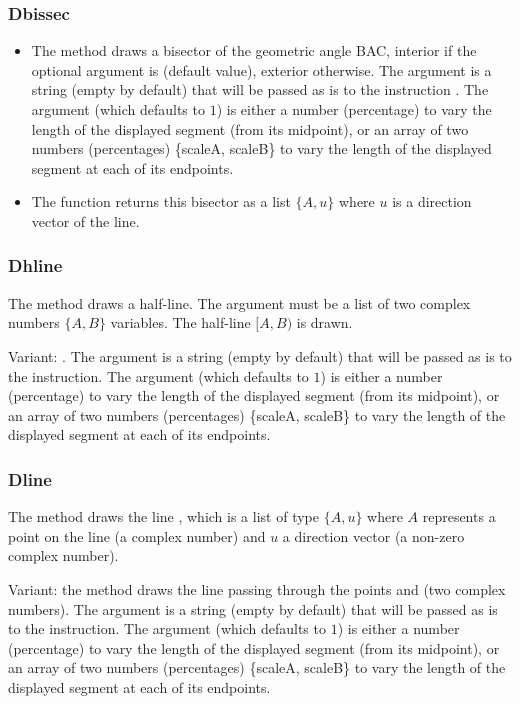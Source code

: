 \newcommand*{\arguScale}{%
The argument \argu{scale} (which defaults to $1$) is either a number (percentage) to vary the length of the displayed segment (from its midpoint), or an array of two numbers (percentages) \{scaleA, scaleB\} to vary the length of the displayed segment at each of its endpoints.
}%

\subsubsection{Dbissec}
\begin{itemize}
    \item The method  draws a bisector of the geometric angle BAC, interior if the optional argument  is \true (default value), exterior otherwise. The argument  is a string (empty by default) that will be passed as is to the instruction \drawcmd. \arguScale
    \item The function  returns this bisector as a list $\{A,u\}$ where $u$ is a direction vector of the line. 
\end{itemize}

\subsubsection{Dhline}
The method  draws a half-line. The argument  must be a list of two complex numbers $\{A,B\}$ variables. The half-line $[A,B)$ is drawn.

Variant: . The argument  is a string (empty by default) that will be passed as is to the \drawcmd instruction. \arguScale

\subsubsection{Dline}
The  method draws the line , which is a list of type $\{A,u\}$ where $A$ represents a point on the line (a complex number) and $u$ a direction vector (a non-zero complex number).

Variant: the  method draws the line passing through the points  and  (two complex numbers). The argument  is a string (empty by default) that will be passed as is to the \drawcmd instruction. \arguScale

